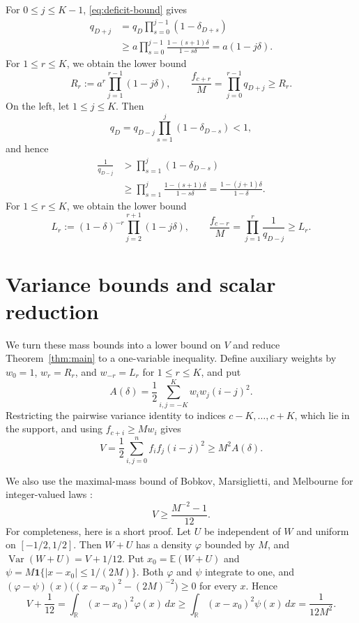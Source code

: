 \documentclass[ECP,preprint]{ejpecp}
\newcommand{\Var}{\operatorname{Var}}
\begin{document}
For $0\leq j\leq K-1$, \eqref{eq:deficit-bound} gives
\[
\begin{aligned}
  q_{D+j}
  &=q_D\prod_{s=0}^{j-1}(1-\delta_{D+s})\\
  &\geq a\prod_{s=0}^{j-1}
    \frac{1-(s+1)\delta}{1-s\delta}
   =a(1-j\delta).
\end{aligned}
\]
For $1\leq r\leq K$, we obtain the lower bound
\begin{equation}\label{eq:right-mass-bound}
  R_r:=a^r\prod_{j=1}^{r-1}(1-j\delta),
  \qquad
  \frac{f_{c+r}}M=\prod_{j=0}^{r-1}q_{D+j}\geq R_r.
\end{equation}
On the left, let $1\leq j\leq K$. Then
\[
  q_D=q_{D-j}\prod_{s=1}^j(1-\delta_{D-s})<1,
\]
and hence
\[
\begin{aligned}
  \frac1{q_{D-j}}
  &>\prod_{s=1}^j(1-\delta_{D-s})\\
  &\geq\prod_{s=1}^j
    \frac{1-(s+1)\delta}{1-s\delta}
   =\frac{1-(j+1)\delta}{1-\delta}.
\end{aligned}
\]
For $1\leq r\leq K$, we obtain the lower bound
\begin{equation}\label{eq:left-mass-bound}
  L_r:=(1-\delta)^{-r}
  \prod_{j=2}^{r+1}(1-j\delta),
  \qquad
  \frac{f_{c-r}}M=\prod_{j=1}^r\frac1{q_{D-j}}\geq L_r.
\end{equation}

\section{Variance bounds and scalar reduction}
\label{sec:variance}

We turn these mass bounds into a lower bound on $V$ and reduce
Theorem~\ref{thm:main} to a one-variable inequality. Define auxiliary weights by $w_0=1$, $w_r=R_r$, and $w_{-r}=L_r$ for
$1\leq r\leq K$, and put
\begin{equation}\label{eq:A-def}
  A(\delta)=\frac12\sum_{i,j=-K}^K w_iw_j(i-j)^2.
\end{equation}
Restricting the pairwise variance identity to indices $c-K,\ldots,c+K$, which
lie in the support, and using $f_{c+i}\geq Mw_i$ gives
\begin{equation}\label{eq:pairwise-variance}
  V=\frac12\sum_{i,j=0}^n f_if_j(i-j)^2
  \geq M^2A(\delta).
\end{equation}

We also use the maximal-mass bound of Bobkov, Marsiglietti, and Melbourne
for integer-valued laws
\cite[Corollary~3.2]{bobkovmarsigliettimelbourne2022}:
\begin{equation}\label{eq:maximal-mass-bound}
  V\geq\frac{M^{-2}-1}{12}.
\end{equation}
For completeness, here is a short proof. Let $U$ be independent of $W$ and
uniform on $[-1/2,1/2]$. Then $W+U$ has a density $\varphi$ bounded by $M$,
and $\Var(W+U)=V+1/12$. Put $x_0=\mathbb E(W+U)$ and
$\psi=M\mathbf 1\{|x-x_0|\leq1/(2M)\}$. Both $\varphi$ and $\psi$ integrate
to one, and $(\varphi-\psi)(x)\bigl((x-x_0)^2-(2M)^{-2}\bigr)\geq0$ for
every $x$. Hence
\[
  V+\frac1{12}
  =\int_{\mathbb R}(x-x_0)^2\varphi(x)\,dx
  \geq\int_{\mathbb R}(x-x_0)^2\psi(x)\,dx
  =\frac1{12M^2}.
\]
\end{document}
